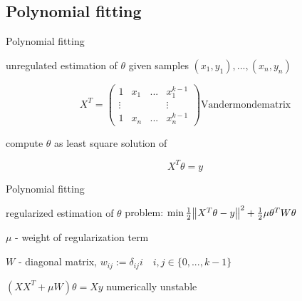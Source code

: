 \documentclass{beamer}
\begin{document}
\subsection{Polynomial fitting}
\begin{frame}{Polynomial fitting}
\begin{block}{unregulated  estimation of \(\theta\)}
given samples \((x_1, y_1), ..., (x_n, y_n)\)

		\begin{equation*}
			X^T = \begin{pmatrix}
			1 & x_1 & ... & x_1^{k-1}\\
			\vdots &&& \vdots\\
			1 & x_n & ... & x_n^{k-1}
			\end{pmatrix} \text{Vandermondematrix}
		\end{equation*}
		
compute \(\theta\) as least square solution of

\begin{equation}
X^T \theta = y
\end{equation}
\end{block}
\end{frame}

\begin{frame}{Polynomial fitting}
\begin{block}{regularized estimation of \(\theta\)}
	problem: \(\min \frac{1}{2} \norm{X^T  \theta -y}^2 + \frac{1}{2} \mu \theta^TW\theta\)
	\vspace{0.5cm}
	\pause
	
	\(\mu\) - weight of regularization term
	
	\(W\) - diagonal matrix, \(w_{ij} := \delta_{ij} i \quad i,j \in \{0,...,k-1\}\)
	\vspace{0.5cm}
	\pause
	
	\(\left(XX^T + \mu W\right) \theta = X y\) \hfill numerically unstable
\end{block}
\end{frame}
\end{document}
